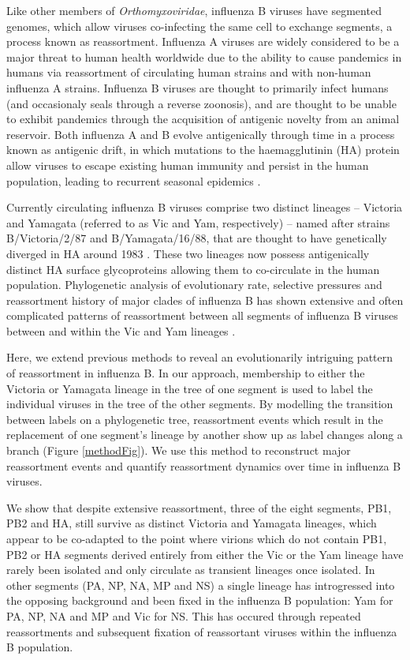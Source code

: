 \documentclass[11pt,oneside,letterpaper]{article}
\begin{document}
Like other members of \textit{Orthomyxoviridae}, influenza B viruses have segmented genomes, which allow viruses co-infecting the same cell to exchange segments, a process known as reassortment. 
Influenza A viruses are widely considered to be a major threat to human health worldwide due to the ability to cause pandemics in humans via reassortment of circulating human strains and with non-human influenza A strains. 
Influenza B viruses are thought to primarily infect humans (and occasionaly seals \cite{osterhaus2000,bodewes2013} through a reverse zoonosis), and are thought to be unable to exhibit pandemics through the acquisition of antigenic novelty from an animal reservoir. 
Both influenza A and B evolve antigenically through time in a process known as antigenic drift, in which mutations to the haemagglutinin (HA) protein allow viruses to escape existing human immunity and persist in the human population, leading to recurrent seasonal epidemics \cite{bedford2014}.

Currently circulating influenza B viruses comprise two distinct lineages -- Victoria and Yamagata (referred to as Vic and Yam, respectively) -- named after strains B/Victoria/2/87 and B/Yamagata/16/88, that are thought to have genetically diverged in HA around 1983 \cite{rota1990}. 
These two lineages now possess antigenically distinct HA surface glycoproteins \cite{kanegae1990,rota1990,nerome1998,nakagawa2002,ansaldi2003} allowing them to co-circulate in the human population.
Phylogenetic analysis of evolutionary rate, selective pressures and reassortment history of major clades of influenza B has shown extensive and often complicated patterns of reassortment between all segments of influenza B viruses between and within the Vic and Yam lineages \cite{chen2008}.

Here, we extend previous methods to reveal an evolutionarily intriguing pattern of reassortment in influenza B.
In our approach, membership to either the Victoria or Yamagata lineage in the tree of one segment is used to label the individual viruses in the tree of the other segments.
By modelling the transition between labels on a phylogenetic tree, reassortment events which result in the replacement of one segment's lineage by another show up as label changes along a branch (Figure \ref{methodFig}).
We use this method to reconstruct major reassortment events and quantify reassortment dynamics over time in influenza B viruses.

We show that despite extensive reassortment, three of the eight segments, PB1, PB2 and HA, still survive as distinct Victoria and Yamagata lineages, which appear to be co-adapted to the point where virions which do not contain PB1, PB2 or HA segments derived entirely from either the Vic or the Yam lineage have rarely been isolated and only circulate as transient lineages once isolated.
In other segments (PA, NP, NA, MP and NS) a single lineage has introgressed into the opposing background and been fixed in the influenza B population: Yam for PA, NP, NA and MP and Vic for NS.
This has occured through repeated reassortments and subsequent fixation of reassortant viruses within the influenza B population.
\end{document}
